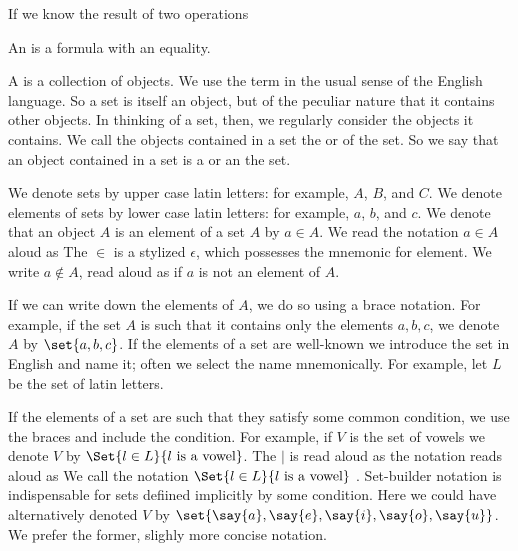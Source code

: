 
\sbasic



\sstart



If we know the result of two operations


An  is a formula
with an equality.

A  is a collection of objects.
We use the term  in the
usual sense of the English language.
So a set is itself an object, but of the peculiar nature
that it contains other objects.
In thinking of a set, then, we regularly consider the
objects it contains.
We call the objects contained in a set the
 or
 of the set.
So we say that an object contained in a set is a
 or an
 the set.


We denote sets by upper case latin letters: for example, $A$, $B$, and $C$.
We denote elements of sets by lower case latin letters: for example, $a$, $b$, and $c$.
We denote that an object $A$ is an element of a set $A$ by $a \in A$.
We read the notation $a \in A$ aloud as 
The $\in$ is a stylized $\epsilon$, which possesses the mnemonic for element.
We write $a \not\in A$, read aloud as  if $a$ is not an element of $A$.

If we can write down the elements of $A$, we do so using a brace notation.
For example, if the set $A$ is such that it contains only the elements $a, b, c$, we denote $A$ by $\set{a, b, c}$.
If the elements of a set are well-known we introduce the set in English and name it; often we select the name mnemonically.
For example, let $L$ be the set of latin letters.

If the elements of a set are such that they satisfy some common condition, we use the braces and include the condition.
For example, if $V$ is the set of vowels we denote $V$ by $\Set{l \in L}{l \text{ is a vowel}}$.
The $\mid$ is read aloud as  the notation reads aloud as 
We call the notation $\Set{l \in L}{l \text{ is a vowel}}$ .
Set-builder notation is indispensable for sets defiined implicitly by some condition.
Here we could have alternatively denoted $V$ by $\set{\say{a},\say{e},\say{i},\say{o},\say{u}}$.
We prefer the former, slighly more concise notation.

